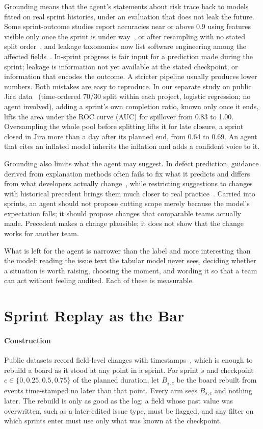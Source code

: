 \documentclass[conference]{IEEEtran}
\begin{document}
Grounding means that the agent's statements about risk trace back to models fitted on real sprint histories, under an evaluation that does not leak the future. Some sprint-outcome studies report accuracies near or above 0.9 using features visible only once the sprint is under way~\cite{perez}, or after resampling with no stated split order~\cite{obike}, and leakage taxonomies now list software engineering among the affected fields~\cite{leakage}. In-sprint progress is fair input for a prediction made during the sprint; leakage is information not yet available at the stated checkpoint, or information that encodes the outcome. A stricter pipeline usually produces lower numbers. Both mistakes are easy to reproduce. In our separate study on public Jira data~\cite{artifact} (time-ordered 70/30 split within each project, logistic regression; no agent involved), adding a sprint's own completion ratio, known only once it ends, lifts the area under the ROC curve (AUC) for spillover from 0.83 to 1.00. Oversampling the whole pool before splitting lifts it for late closure, a sprint closed in Jira more than a day after its planned end, from 0.64 to 0.69. An agent that cites an inflated model inherits the inflation and adds a confident voice to it.

Grounding also limits what the agent may suggest. In defect prediction, guidance derived from explanation methods often fails to fix what it predicts and differs from what developers actually change~\cite{saner}, while restricting suggestions to changes with historical precedent brings them much closer to real practice~\cite{counteract}. Carried into sprints, an agent should not propose cutting scope merely because the model's expectation falls; it should propose changes that comparable teams actually made. Precedent makes a change plausible; it does not show that the change works for another team.

What is left for the agent is narrower than the label and more interesting than the model: reading the issue text the tabular model never sees, deciding whether a situation is worth raising, choosing the moment, and wording it so that a team can act without feeling audited. Each of these is measurable.

\section{Sprint Replay as the Bar}
\label{sec:replay}

\paragraph{Construction} Public datasets record field-level changes with timestamps~\cite{tawos}, which is enough to rebuild a board as it stood at any point in a sprint. For sprint $s$ and checkpoint $c \in \{0, 0.25, 0.5, 0.75\}$ of the planned duration, let $B_{s,c}$ be the board rebuilt from events time-stamped no later than that point. Every arm sees $B_{s,c}$ and nothing later. The rebuild is only as good as the log: a field whose past value was overwritten, such as a later-edited issue type, must be flagged, and any filter on which sprints enter must use only what was known at the checkpoint.
\end{document}
